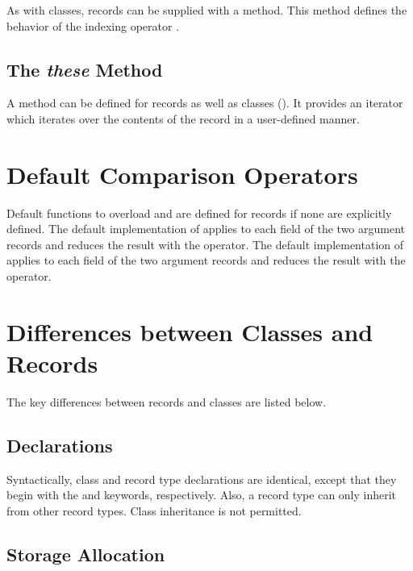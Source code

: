 As with classes, records can be supplied with a  method.  This method
defines the behavior of the indexing operator \chpl{[]}.

\subsection{The {\em these} Method}

A  method can be defined for records as well as classes ().  It
provides an iterator which iterates over the contents of the record in a
user-defined manner.

\section{Default Comparison Operators}
\label{Record_Comparison_Operators}

Default functions to overload \chpl{==} and \chpl{\!=} are defined for
records if none are explicitly defined.
The default implementation of \chpl{==} applies \chpl{==} to each
field of the two argument records and reduces the result with
the \chpl{&&} operator.  The default implementation of \chpl{\!=}
applies \chpl{\!=} to each field of the two argument records and
reduces the result with the \chpl{||} operator.

\section{Differences between Classes and Records}
\label{Class_and_Record_Differences}

The key differences between records and classes are listed below.

\subsection{Declarations}
\label{Declaration_Differences}

Syntactically, class and record type declarations are identical, except that
they begin with the  and  keywords, respectively.
Also, a record type can only inherit from other record types.  Class inheritance
is not permitted.

\subsection{Storage Allocation}
\label{Storage_Allocation_Differences}

